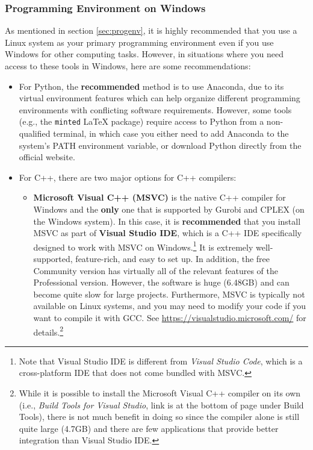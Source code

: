 \documentclass[12pt]{article}
\begin{document}
\subsubsection{Programming Environment on Windows}
As mentioned in section \ref{sec:progenv}, it is highly recommended that you use a Linux system as your primary programming environment even if you use Windows for other computing tasks.
However, in situations where you need access to these tools in Windows, here are some recommendations:

\begin{itemize}
    \item For Python, the \textbf{recommended} method is to use Anaconda, due to its virtual environment features which can help organize different programming environments with conflicting software requirements.
        However, some tools (e.g., the \texttt{minted} LaTeX package) require access to Python from a non-qualified terminal, in which case you either need to add Anaconda to the system's PATH environment variable, or download Python directly from the official website.
    \item For C++, there are two major options for C++ compilers:
        \begin{itemize}
            \item \textbf{Microsoft Visual C++ (MSVC)} is the native C++ compiler for Windows and the \textbf{only} one that is supported by Gurobi and CPLEX (on the Windows system).
                In this case, it is \textbf{recommended} that you install MSVC as part of \textbf{Visual Studio IDE}, which is a C++ IDE specifically designed to work with MSVC on Windows.\footnote{
                    Note that Visual Studio IDE is different from \emph{Visual Studio Code}, which is a cross-platform IDE that does not come bundled with MSVC.
                }
                It is extremely well-supported, feature-rich, and easy to set up.
                In addition, the free Community version has virtually all of the relevant features of the Professional version.
                However, the software is huge (6.48GB) and can become quite slow for large projects.
                Furthermore, MSVC is typically not available on Linux systems, and you may need to modify your code if you want to compile it with GCC.
                See \url{https://visualstudio.microsoft.com/} for details.\footnote{
                    While it is possible to install the Microsoft Visual C++ compiler on its own (i.e., \emph{Build Tools for Visual Studio}, link is at the bottom of page under Build Tools), there is not much benefit in doing so since the compiler alone is still quite large (4.7GB) and there are few applications that provide better integration than Visual Studio IDE.
}
\end{itemize}
\end{itemize}
\end{document}
